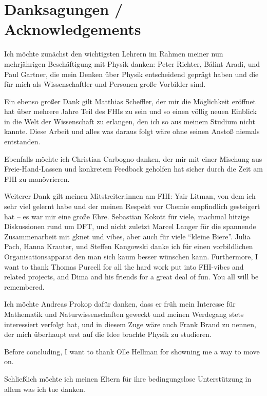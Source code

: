 \chapter{Danksagungen / Acknowledgements}

Ich möchte zunächst den wichtigsten Lehrern im Rahmen meiner nun mehrjährigen Beschäftigung mit Physik danken: Peter Richter, Bálint Aradi, und Paul Gartner, die mein Denken über Physik entscheidend geprägt haben und die für mich als Wissenschaftler und Personen große Vorbilder sind.

Ein ebenso großer Dank gilt Matthias Scheffler, der mir die Möglichkeit eröffnet hat über mehrere Jahre Teil des FHIs zu sein und so einen völlig neuen Einblick in die Welt der Wissenschaft zu erlangen, den ich so aus meinem Studium nicht kannte. Diese Arbeit und alles was daraus folgt wäre ohne seinen Anstoß niemals entstanden.

Ebenfalls möchte ich Christian Carbogno danken, der mir mit einer Mischung aus Freie-Hand-Lassen und konkretem Feedback geholfen hat sicher durch die Zeit am FHI zu manövrieren.

Weiterer Dank gilt meinen Mitstreiter:innen am FHI: Yair Litman, von dem ich sehr viel gelernt habe und der meinen Respekt vor Chemie empfindlich gesteigert hat -- es war mir eine große Ehre. Sebastian Kokott für viele, machmal hitzige Diskussionen rund um DFT, und nicht zuletzt Marcel Langer für die spannende Zusammenarbeit mit gknet und vibes, aber auch für viele ``kleine Biere''. Julia Pach, Hanna Krauter, und Steffen Kangowski danke ich für einen vorbildlichen Organisationsapparat den man sich kaum besser wünschen kann. 
Furthermore, I want to thank Thomas Purcell for all the hard work put into FHI-vibes and related projects, and Dima and his friends for a great deal of fun. You all will be remembered.

Ich möchte Andreas Prokop dafür danken, dass er früh mein Interesse für Mathematik und Naturwissenschaften geweckt und meinen Werdegang stets interessiert verfolgt hat, und in diesem Zuge wäre auch Frank Brand zu nennen, der mich überhaupt erst auf die Idee brachte Physik zu studieren.

Before concluding, I want to thank Olle Hellman for showning me a way to move on.

Schließlich möchte ich meinen Eltern für ihre bedingungslose Unterstützung in allem was ich tue danken.
